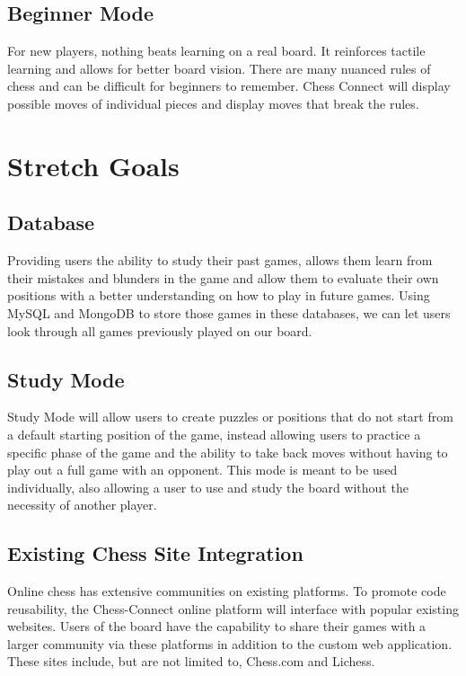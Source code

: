\documentclass{article}
\begin{document}
\subsection{Beginner Mode}
{For new players, nothing beats learning on a real board. It reinforces tactile learning and allows for better board vision. There are many nuanced rules of chess and can be difficult for beginners to remember. Chess Connect will display possible moves of individual pieces and display moves that break the rules.}

\section{Stretch Goals}
\subsection{Database}
{Providing users the ability to study their past games, allows them learn from their mistakes and blunders in the game and allow them to evaluate their own positions with a better understanding on how to play in future games. Using MySQL and MongoDB to store those games in these databases, we can let users look through all games previously played on our board.}

\subsection{Study Mode}
{Study Mode will allow users to create puzzles or positions that do not start from a default starting position of the game, instead allowing users to practice a specific phase of the game and the ability to take back moves without having to play out a full game with an opponent. This mode is meant to be used individually, also allowing a user to use and study the board without the necessity of another player.}

\subsection{Existing Chess Site Integration}
{Online chess has extensive communities on existing platforms. To promote code reusability, the Chess-Connect online platform will interface with popular existing websites.
Users of the board have the capability to share their games with a larger community via these platforms in addition to the custom web application. These sites include, but are not limited to, Chess.com and Lichess.}
\end{document}
